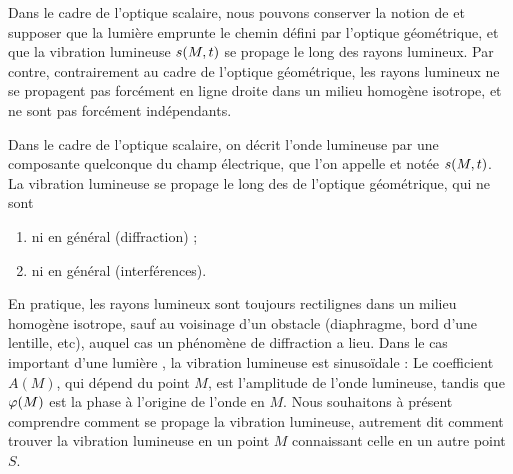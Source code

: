 \documentclass[12pt,fancy]{cours}
\begin{document}
Dans le cadre de l'optique scalaire, nous pouvons conserver la notion de  et supposer que la lumière emprunte le chemin défini par l'optique géométrique, et que la vibration lumineuse $s(M,t)$ se propage le long des rayons lumineux. Par contre, contrairement au cadre de l'optique géométrique, les rayons lumineux ne se propagent pas forcément en ligne droite dans un milieu homogène isotrope, et ne sont pas forcément indépendants.

\begin{prop}\label{prop:vibration}
Dans le cadre de l'optique scalaire, on décrit l'onde lumineuse par une composante quelconque du champ électrique, que l'on appelle  et notée $s(M,t)$. La vibration lumineuse se propage le long des  de l'optique géométrique, qui ne sont 
\begin{enumerate}
  \item ni  en général (diffraction) ;
  \item ni  en général (interférences).
\end{enumerate}
\end{prop}
En pratique, les rayons lumineux sont toujours rectilignes dans un milieu homogène isotrope, sauf au voisinage d'un obstacle (diaphragme, bord d'une lentille, etc), auquel cas un phénomène de diffraction a lieu.
Dans le cas important d'une lumière , la vibration lumineuse est sinusoïdale :
Le coefficient $A(M)$, qui dépend du point $M$, est l'amplitude de l'onde lumineuse, tandis que $\varphi(M)$ est la phase à l'origine de l'onde en $M$. Nous souhaitons à présent comprendre comment se propage la vibration lumineuse, autrement dit comment trouver la vibration lumineuse en un point $M$ connaissant celle en un autre point $S$.


\end{document}
